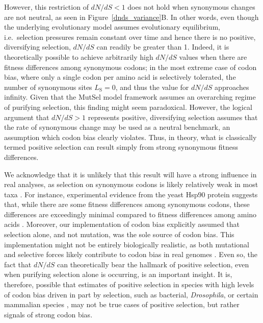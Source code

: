 \documentclass{pnastwo}
\begin{document}
\begin{article}
However, this restriction of $dN/dS < 1$ does not hold when synonymous changes are not neutral, as seen in Figure~\ref{dnds_variance}B. In other words, even though the underlying evolutionary model assumes evolutionary equilibrium, i.e.\ selection pressures remain constant over time and hence there is no positive, diversifying selection, $dN/dS$ can readily be greater than 1. Indeed, it is theoretically possible to achieve arbitrarily high $dN/dS$ values when there are fitness differences among synonymous codons; in the most extreme case of codon bias, where only a single codon per amino acid is selectively tolerated, the number of synonymous sites $L_\text{S} = 0$, and thus the value for $dN/dS$ approaches infinity. Given that the MutSel model framework assumes an overarching regime of purifying selection, this finding might seem paradoxical. However, the logical argument that $dN/dS > 1$ represents positive, diversifying selection assumes that the rate of synonymous change may be used as a neutral benchmark, an assumption which codon bias clearly violates. Thus, in theory, what is classically termed positive selection can result simply from strong synonymous fitness differences. 	
		
We acknowledge that it is unlikely that this result will have a strong influence in real analyses, as selection on synonymous codons is likely relatively weak in most taxa \cite{HershbergPetrov2008}. For instance, experimental evidence from the yeast Hsp90 protein suggests that, while there are some fitness differences among synonymous codons, these differences are exceedingly minimal compared to fitness differences among amino acids \cite{Hietpas2011,Hietpas2013}. Moreover, our implementation of codon bias explicitly assumed that selection alone, and not mutation, was the sole source of codon bias. This implementation might not be entirely biologically realistic, as both mutational and selective forces likely contribute to codon bias in real genomes \cite{Blumer1991, Duret2002, HershbergPetrov2008, Chen2009, PlotkinKudla2010}. Even so, the fact that $dN/dS$ can theoretically bear the hallmark of positive selection, even when purifying selection alone is occurring, is an important insight. It is, therefore, possible that estimates of positive selection in species with high levels of codon bias driven in part by selection, such as bacterial, \textit{Drosophila}, or certain mammalian species \cite{Duret2002, Chamaryetal2006, PlotkinKudla2010}, may not be true cases of positive selection, but rather signals of strong codon bias. 


\end{article}
\end{document}
